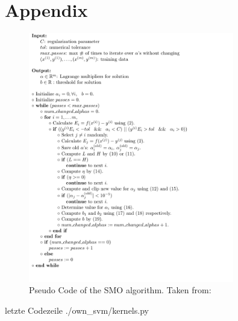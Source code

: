 \section{Appendix}
\begin{figure}
  \centering
    \includegraphics[width=0.8\textwidth]{media_saved/pseudo_code}
  \caption{Pseudo Code of the SMO algorithm. Taken from: \cite{smo}}
  \label{fig:gull}
\end{figure}

 letzte Codezeile
{./own_svm/kernels.py}


\newpage
\printbibliography %
        